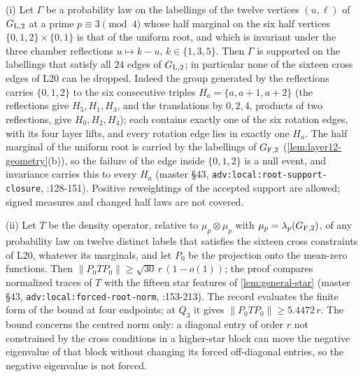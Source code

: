\begin{remark}\label{rem:obs:root-support}
(i) Let $\Gamma$ be a probability law on the labellings of the twelve vertices
$(u,\ell)$ of $G_{\rm L,2}$ at a prime $p\equiv3\pmod4$ whose half marginal on the six half vertices $\{0,1,2\}\times\{0,1\}$ is that of the uniform root, and which is
invariant under the three chamber reflections $u\mapsto k-u$, $k\in\{1,3,5\}$.
Then $\Gamma$ is supported on the labellings that satisfy all $24$ edges of
$G_{\rm L,2}$; in particular none of the sixteen cross edges of L20 can be
dropped. Indeed the group generated by the reflections carries $\{0,1,2\}$ to the
six consecutive triples $H_a=\{a,a+1,a+2\}$ (the reflections give $H_5,H_1,H_3$,
and the translations by $0,2,4$, products of two reflections, give $H_0,H_2,H_4$);
each contains exactly one of the six rotation edges, with
its four layer lifts, and every rotation edge lies in exactly one $H_a$. The half
marginal of the uniform root is carried by the labellings of $G_{\rm F,2}$
(\cref{lem:layer12-geometry}(b)), so the failure of the edge inside $\{0,1,2\}$
is a null event, and invariance carries this to every $H_a$ (master \S43,
\texttt{adv:local:root-support-closure},
:128-151). Positive
reweightings of the accepted support are allowed; signed measures and changed
half laws are not covered.

(ii) Let $T$ be the density operator, relative to $\mu_p\otimes\mu_p$ with
$\mu_p=\lambda_p(G_{\rm F,2})$, of any probability law on twelve distinct labels
that satisfies the sixteen cross constraints of L20, whatever its marginals,
and let $P_0$ be the projection onto the mean-zero functions. Then
$\|P_0TP_0\|\ge\sqrt{30}\,r\,(1-o(1))$; the proof compares normalized traces of
$T$ with the fifteen star features of \cref{lem:general-star}
(master \S43, \texttt{adv:local:forced-root-norm},
:153-213). The record
 evaluates the
finite form of the bound at four endpoints; at $Q_3$ it gives
$\|P_0TP_0\|\ge5.4472\,r$. The bound concerns the centred norm only: a diagonal entry of order $r$ not constrained by the cross conditions in a higher-star block can move the negative
eigenvalue of that block without changing its forced off-diagonal entries, so the
negative eigenvalue is not forced.
\end{remark}

